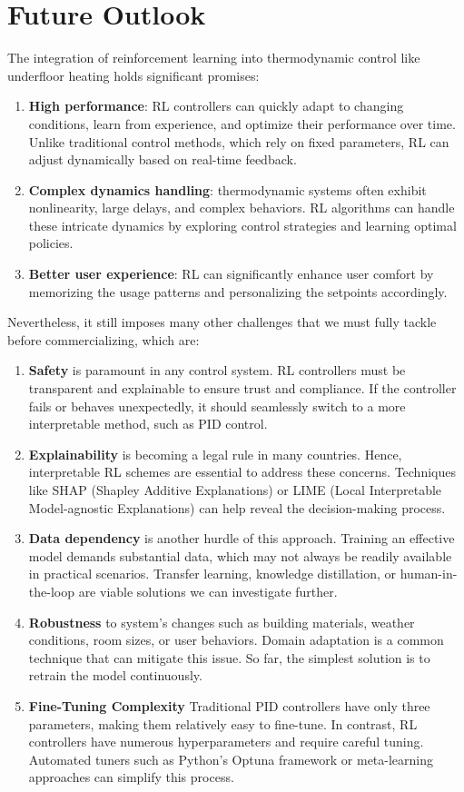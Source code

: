 \documentclass[../main.tex]{subfiles}
\begin{document}
\section{Future Outlook}
The integration of reinforcement learning into thermodynamic control like underfloor heating holds significant promises:
\begin{enumerate}
    \item \textbf{High performance}: RL controllers can quickly adapt to changing conditions, learn from experience, and optimize their performance over time. Unlike traditional control methods, which rely on fixed parameters, RL can adjust dynamically based on real-time feedback.
   \item \textbf{Complex dynamics handling}: thermodynamic systems often exhibit nonlinearity, large delays, and complex behaviors. RL algorithms can handle these intricate dynamics by exploring control strategies and learning optimal policies.
   \item \textbf{Better user experience}: RL can significantly enhance user comfort by memorizing the usage patterns and personalizing the setpoints accordingly.
\end{enumerate}

Nevertheless, it still imposes many other challenges that we must fully tackle before commercializing, which are:
\begin{enumerate}
    \item \textbf{Safety} is paramount in any control system. RL controllers must be transparent and explainable to ensure trust and compliance. If the controller fails or behaves unexpectedly, it should seamlessly switch to a more interpretable method, such as PID control.
    \item \textbf{Explainability} is becoming a legal rule in many countries. Hence, interpretable RL schemes are essential to address these concerns. Techniques like SHAP (Shapley Additive Explanations) or LIME (Local Interpretable Model-agnostic Explanations) can help reveal the decision-making process.
    \item \textbf{Data dependency} is another hurdle of this approach. Training an effective model demands substantial data, which may not always be readily available in practical scenarios. Transfer learning, knowledge distillation, or human-in-the-loop are viable solutions we can investigate further.
    \item \textbf{Robustness} to system's changes such as building materials, weather conditions, room sizes, or user behaviors. Domain adaptation is a common technique that can mitigate this issue. So far, the simplest solution is to retrain the model continuously.
    \item \textbf{Fine-Tuning Complexity} Traditional PID controllers have only three parameters, making them relatively easy to fine-tune. In contrast, RL controllers have numerous hyperparameters and require careful tuning. Automated tuners such as Python's Optuna framework or meta-learning approaches can simplify this process.
\end{enumerate}
\end{document}
